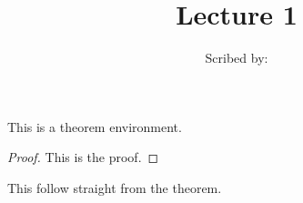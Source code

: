 \documentclass{article}
\begin{document}
  \title{Lecture 1}
  \author{Scribed by: }
  \maketitle

  \begin{theorem}
    This is a theorem environment.
  \end{theorem}
  \begin{proof}
    This is the proof.
  \end{proof}

  \begin{corollary}
    This follow straight from the theorem.
  \end{corollary}
\end{document}

